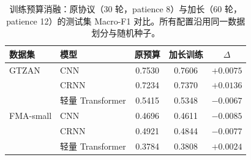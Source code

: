 \begin{table}[H]
\centering\small
\caption{训练预算消融：原协议（30 轮，patience 8）与加长（60 轮，patience 12）的测试集 Macro-F1 对比。所有配置沿用同一数据划分与随机种子。}
\label{tab:budget}
\begin{tabular}{llccc}
\toprule
数据集 & 模型 & 原预算 & 加长训练 & $\Delta$\\
\midrule
GTZAN & CNN & 0.7530 & 0.7606 & $+0.0075$\\
 & CRNN & 0.7234 & 0.7370 & $+0.0136$\\
 & 轻量 Transformer & 0.5415 & 0.5348 & $-0.0067$\\
\midrule
FMA-small & CNN & 0.4696 & 0.4611 & $-0.0085$\\
 & CRNN & 0.4921 & 0.4844 & $-0.0077$\\
 & 轻量 Transformer & 0.3784 & 0.3808 & $+0.0024$\\
\bottomrule
\end{tabular}
\end{table}
